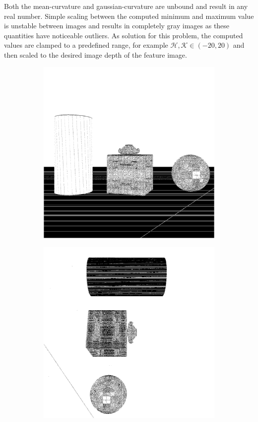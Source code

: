 Both the \gls{mean-curvature} and \gls{gaussian-curvature} are unbound and result in any real number.
Simple scaling between the computed minimum and maximum value is unstable between images and results in completely gray images as these quantities have noticeable outliers.
As solution for this problem, the computed values are clamped to a predefined range, for example $\mathcal{H},\mathcal{K} \in (-20, 20)$ and then scaled to the desired image depth of the feature image.
\begin{figure}[tb]
    \begin{subfigure}[t]{0.32\textwidth}
        \includegraphics[width=\linewidth]{chapter04/img/gauss-0001.png}
    \end{subfigure}
    \begin{subfigure}[t]{0.32\textwidth}
        \includegraphics[width=\linewidth]{chapter04/img/gauss-0030.png}

\end{subfigure}
\end{figure}
